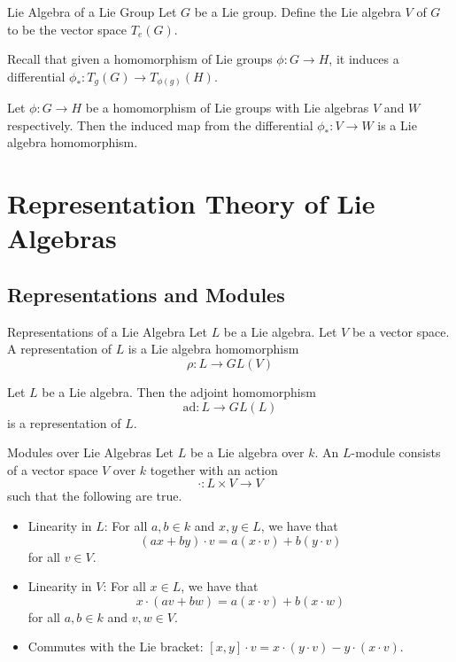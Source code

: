 \documentclass[a4paper]{article}
\begin{document}
\begin{defn}{Lie Algebra of a Lie Group}{} Let $G$ be a Lie group. Define the Lie algebra $V$ of $G$ to be the vector space $T_e(G)$. 
\end{defn}

Recall that given a homomorphism of Lie groups $\phi:G\to H$, it induces a differential $\phi_\ast:T_g(G)\to T_{\phi(g)}(H)$. 

\begin{prp}{}{} Let $\phi:G\to H$ be a homomorphism of Lie groups with Lie algebras $V$ and $W$ respectively. Then the induced map from the differential $\phi_\ast:V\to W$ is a Lie algebra homomorphism. 
\end{prp}

\pagebreak
\section{Representation Theory of Lie Algebras}
\subsection{Representations and Modules}
\begin{defn}{Representations of a Lie Algebra}{} Let $L$ be a Lie algebra. Let $V$ be a vector space. A representation of $L$ is a Lie algebra homomorphism $$\rho:L\to GL(V)$$
\end{defn}

\begin{lmm}{}{} Let $L$ be a Lie algebra. Then the adjoint homomorphism $$\text{ad}:L\to GL(L)$$ is a representation of $L$. 
\end{lmm}

\begin{defn}{Modules over Lie Algebras}{} Let $L$ be a Lie algebra over $k$. An $L$-module consists of a vector space $V$ over $k$ together with an action $$\cdot:L\times V\to V$$ such that the following are true. 
\begin{itemize}
\item Linearity in $L$: For all $a,b\in k$ and $x,y\in L$, we have that $$(ax+by)\cdot v=a(x\cdot v)+b(y\cdot v)$$ for all $v\in V$. 
\item Linearity in $V$: For all $x\in L$, we have that $$x\cdot(av+bw)=a(x\cdot v)+b(x\cdot w)$$ for all $a,b\in k$ and $v,w\in V$. 
\item Commutes with the Lie bracket: $[x,y]\cdot v=x\cdot(y\cdot v)-y\cdot(x\cdot v)$. 
\end{itemize}
\end{defn}
\end{document}
